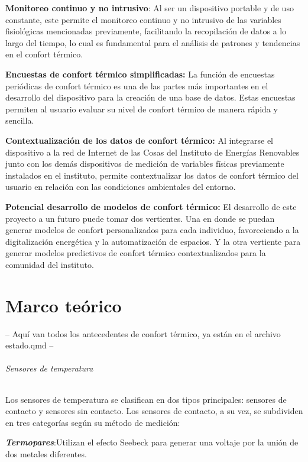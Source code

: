 \documentclass[
  letterpaper,
  DIV=11,
  numbers=noendperiod]{scrreport}
\let\oldsubparagraph\subparagraph
\renewcommand{\subparagraph}[1]{\oldsubparagraph{#1}\mbox{}}
\begin{document}
\textbf{Monitoreo continuo y no intrusivo}: Al ser un dispositivo
portable y de uso constante, este permite el monitoreo continuo y no
intrusivo de las variables fisiológicas mencionadas previamente,
facilitando la recopilación de datos a lo largo del tiempo, lo cual es
fundamental para el análisis de patrones y tendencias en el confort
térmico.

\textbf{Encuestas de confort térmico simplificadas:} La función de
encuestas periódicas de confort térmico es una de las partes más
importantes en el desarrollo del dispositivo para la creación de una
base de datos. Estas encuestas permiten al usuario evaluar su nivel de
confort térmico de manera rápida y sencilla.

\textbf{Contextualización de los datos de confort térmico:} Al
integrarse el dispositivo a la red de Internet de las Cosas del
Instituto de Energías Renovables junto con los demás dispositivos de
medición de variables físicas previamente instalados en el instituto,
permite contextualizar los datos de confort térmico del usuario en
relación con las condiciones ambientales del entorno.

\textbf{Potencial desarrollo de modelos de confort térmico:} El
desarrollo de este proyecto a un futuro puede tomar dos vertientes. Una
en donde se puedan generar modelos de confort personalizados para cada
individuo, favoreciendo a la digitalización energética y la
automatización de espacios. Y la otra vertiente para generar modelos
predictivos de confort térmico contextualizados para la comunidad del
instituto.


\hypertarget{marco-teuxf3rico}{%
\chapter{Marco teórico}\label{marco-teuxf3rico}}

-- Aquí van todos los antecedentes de confort térmico, ya están en el
archivo estado.qmd --

\hypertarget{sensores-de-temperatura}{%
\subparagraph{Sensores de temperatura}\label{sensores-de-temperatura}}

Los sensores de temperatura se clasifican en dos tipos principales:
sensores de contacto y sensores sin contacto. Los sensores de contacto,
a su vez, se subdividen en tres categorías según su método de medición:

\textbf{\emph{Termopares}}:Utilizan el efecto Seebeck para generar una
voltaje por la unión de dos metales diferentes.
\end{document}
